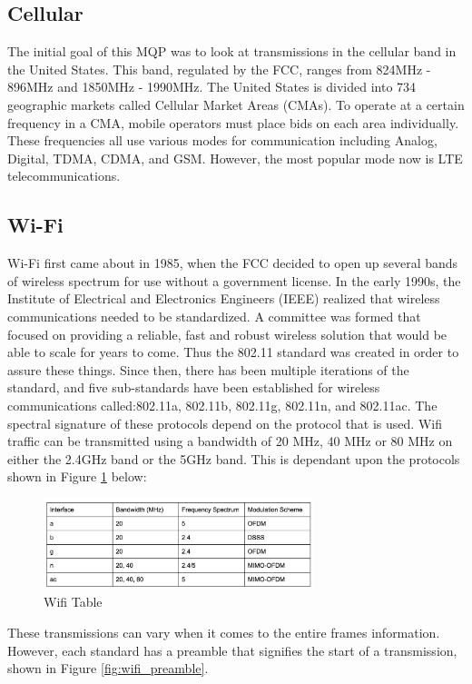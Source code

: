 \subsection{Cellular}
The initial goal of this MQP was to look at transmissions in the cellular band in the United States. This band, regulated by the FCC, ranges from 824MHz - 896MHz and 1850MHz - 1990MHz. The United States is divided into 734 geographic markets called Cellular Market Areas (CMAs). To operate at a certain frequency in a CMA, mobile operators must place bids on each area individually. These frequencies all use various modes for communication including Analog, Digital, TDMA, CDMA, and GSM. However, the most popular mode now is LTE telecommunications.

\subsection{Wi-Fi}
Wi-Fi first came about in 1985, when the FCC decided to open up several bands of wireless spectrum for use without a government license. In the early 1990s, the Institute of Electrical and Electronics Engineers (IEEE) realized that wireless communications needed to be standardized. A committee was formed that focused on providing a reliable, fast and robust wireless solution that would be able to scale for years to come. Thus the 802.11 standard was created in order to assure these things. Since then, there has been multiple iterations of the standard, and five sub-standards have been established for wireless communications called:802.11a, 802.11b, 802.11g, 802.11n, and 802.11ac. The spectral signature of these protocols depend on the protocol that is used. Wifi traffic can be transmitted using a bandwidth of 20 MHz, 40 MHz or 80 MHz on either the 2.4GHz band or the 5GHz band. This is dependant upon the protocols shown in Figure \ref{fig:wifi_table} below:
\begin{figure}[ht]
\centering
\includegraphics[width=0.70\textwidth]{img/wifi_table.png}
\caption{Wifi Table}
\label{fig:wifi_table}
\end{figure}\par
These transmissions can vary when it comes to the entire frames information. However, each standard has a preamble that signifies the start of a transmission, shown in Figure \ref{fig:wifi_preamble}.
